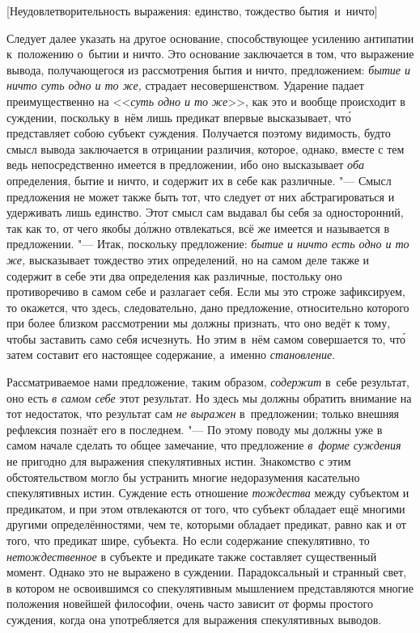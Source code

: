 %
{[Неудовлетворительность выражения: единство, тождество бытия~и~ничто]}

Следует далее указать на другое основание, способствующее усилению антипатии
к~положению о~бытии и ничто. Это основание заключается в том, что выражение
вывода, получающегося из рассмотрения бытия и ничто, предложением:
{\em бытие и ничто суть одно и то же,} страдает несовершенством. Ударение
падает преимущественно на <<{\em суть одно и то же}>>, как это и вообще
происходит в суждении, поскольку в~нём лишь предикат впервые высказывает,
чт\'{о} представляет собою субъект суждения. Получается поэтому видимость,
будто смысл вывода заключается в отрицании различия, которое, однако, вместе с
тем ведь непосредственно имеется в предложении, ибо оно высказывает {\em оба}
определения, бытие и ничто, и содержит их в себе как различные. "--- Смысл
предложения не может также быть тот, что следует от них абстрагироваться и
удерживать лишь единство. Этот смысл сам выдавал бы себя за односторонний, так
как то, от чего якобы д\'{о}лжно отвлекаться, всё же имеется и называется в
предложении. "--- Итак, поскольку предложение: {\em бытие и ничто есть одно и
то же,} высказывает тождество этих определений, но на самом деле также и
содержит в себе эти два определения как различные, постольку оно противоречиво
в самом себе и разлагает себя. Если мы это строже зафиксируем, то окажется, что
здесь, следовательно, дано предложение, относительно которого при более близком
рассмотрении мы должны признать, что оно ведёт к тому, чтобы заставить само
себя исчезнуть. Но этим в~нём самом совершается то, чт\'{о} затем составит его
настоящее содержание, а~именно {\em становление}.

Рассматриваемое нами предложение, таким образом, {\em содержит} в~себе
результат, оно есть {\em в самом себе} этот результат. Но здесь мы должны
обратить внимание на тот недостаток, что результат сам {\em не выражен}
в~предложении; только внешняя рефлексия познаёт его в последнем. "--- По этому
поводу мы должны уже в самом начале сделать то общее замечание, что предложение
{\em в~форме суждения} не пригодно для выражения спекулятивных истин.
Знакомство с этим обстоятельством могло бы устранить многие недоразумения
касательно спекулятивных истин. Суждение есть отношение {\em тождества} между
субъектом и предикатом, и при этом отвлекаются от того, что субъект обладает
ещё многими другими определённостями, чем те, которыми обладает предикат, равно
как и от того, что предикат шире, субъекта. Но если содержание спекулятивно, то
{\em нетождественное} в субъекте и предикате также составляет существенный
момент. Однако это не выражено в суждении. Парадоксальный и странный свет, в
котором не освоившимся со спекулятивным мышлением представляются многие
положения новейшей философии, очень часто зависит от формы простого суждения,
когда она употребляется для выражения спекулятивных выводов.

